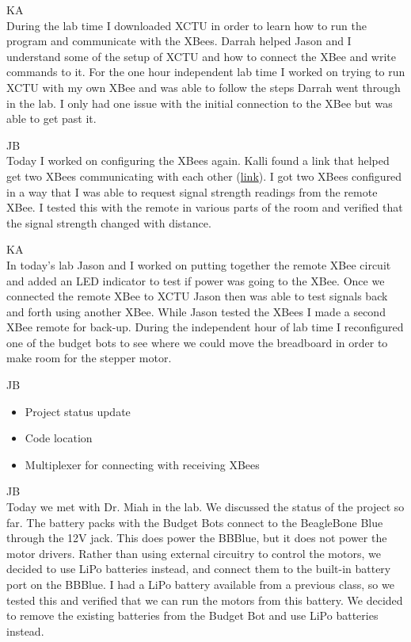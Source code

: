 \documentclass[fontsize=11pt, %
                             paper=letter, %
                             openany, %
                             captions=tableheading,
                             index=totoc,
                             hyperref]{labbook}
\begin{document}
\begin{addmargin}[0cm]{0cm}
\vspace*{12pt}
KA\\
During the lab time I downloaded XCTU in order to learn how to run the program and communicate with the XBees. Darrah helped Jason and I understand some of the setup of XCTU and how to connect the XBee and write commands to it. For the one hour independent lab time I worked on trying to run XCTU with my own XBee and was able to follow the steps Darrah went through in the lab. I only had one issue with the initial connection to the XBee but was able to get past it. 

JB\\
Today I worked on configuring the XBees again. Kalli found a link that helped get two XBees communicating with each other (\href{https://www.digi.com/resources/documentation/Digidocs/90002126/tasks/t_configure_remote_devices.htm}{link}). I got two XBees configured in a way that I was able to request signal strength readings from the remote XBee. I tested this with the remote in various parts of the room and verified that the signal strength changed with distance.

\vspace*{12pt}
KA\\
In today's lab Jason and I worked on putting together the remote XBee circuit and added an LED indicator to test if power was going to the XBee. Once we connected the remote XBee to XCTU Jason then was able to test signals back and forth using another XBee. While Jason tested the XBees I made a second XBee remote for back-up. During the independent hour of lab time I reconfigured one of the budget bots to see where we could move the breadboard in order to make room for the stepper motor. 

JB\\
\begin{itemize}
    \item Project status update
    \item Code location
    \item Multiplexer for connecting with receiving XBees
\end{itemize}

JB\\
Today we met with Dr. Miah in the lab. We discussed the status of the project so far. The battery packs with the Budget Bots connect to the BeagleBone Blue through the 12V jack. This does power the BBBlue, but it does not power the motor drivers. Rather than using external circuitry to control the motors, we decided to use LiPo batteries instead, and connect them to the built-in battery port on the BBBlue. I had a LiPo battery available from a previous class, so we tested this and verified that we can run the motors from this battery. We decided to remove the existing batteries from the Budget Bot and use LiPo batteries instead.\vspace{12pt}


\end{addmargin}
\end{document}
